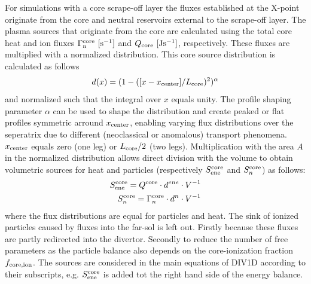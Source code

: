 \documentclass[amsmath,amssymb,a4]{revtex4-2}
\begin{document}
For simulations with a core scrape-off layer the fluxes established at the X-point originate from the core and neutral reservoirs external to the scrape-off layer. The plasma sources that originate from the core are calculated using the total core heat and ion fluxes $\Gamma^{\rm core}_{\rm n}~\mathrm{[ s^{-1}]}$ and $Q_{\rm core}~\mathrm{[J s^{-1}]}$, respectively. These fluxes are multiplied with a normalized distribution.
This core source distribution is calculated as follows
\begin{equation}
    d(x) = (1 - ([x-x_{\rm center}]/L_{\rm core})^2)^{\alpha} 
\end{equation}
and normalized such that the integral over $x$ equals unity. The profile shaping parameter $\alpha$ can be used to shape the distribution and create peaked or flat profiles symmetric arround $x_{\rm center}$, enabling varying flux distributions over the seperatrix due to different (neoclassical or anomalous) transport phenomena. $x_{\rm center}$ equals zero (one leg) or $L_{\rm core}/2$ (two legs). Multiplication with the area $A$ in the normalized distribution allows direct division with the volume to obtain volumetric sources for heat and particles (respectively $S_{\rm ene}^{\rm core} $ and $S_{n}^{\rm core}$) as follows:
\begin{equation}
\begin{aligned}
    S_{\rm ene}^{\rm core} = Q^{\rm core} \cdot d^{ene} \cdot  V^{-1} \\
    S_{n}^{\rm core} = \Gamma_{n}^{\rm core} \cdot d^n \cdot  V^{-1} 
    \end{aligned}
\end{equation}
where the flux distributions are equal for particles and heat. The sink of ionized particles caused by fluxes into the far-sol is left out. Firstly because these fluxes are partly redirected into the divertor. Secondly to reduce the number of free parameters as the particle balance also depends on the core-ionization fraction $f_{\rm core,ion}$. The sources are considered in the main equations of DIV1D according to their subscripts, e.g. $S_{\rm ene}^{\rm core}$ is added tot the right hand side of the energy balance.
\end{document}
